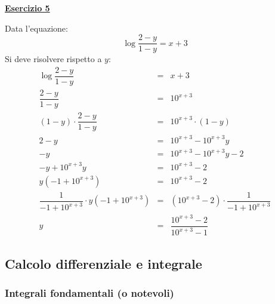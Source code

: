 \documentclass[a4paper]{article}
\newcommand{\example}[1]{\textcolor{Green4}{\textbf{#1}}}
\begin{document}
	\begin{flushleft}
		\example{\underline{Esercizio 5}}
	\end{flushleft}

	\noindent
	Data l'equazione:
	\begin{equation*}
		\log{\dfrac{2-y}{1-y}} = x+3
	\end{equation*}
	Si deve risolvere rispetto a $y$:
	\begin{equation*}
		\begin{array}{rcl}
			\log{\dfrac{2-y}{1-y}} &=& x+3 \\ [1em]
			\dfrac{2-y}{1-y} &=& 10^{x+3} \\ [1em]
			\left(1-y\right) \cdot \dfrac{2-y}{1-y} &=& 10^{x+3} \cdot \left(1-y\right) \\ [1em]
			2-y &=& 10^{x+3} - 10^{x+3}y \\ [1em]
			-y &=& 10^{x+3} - 10^{x+3}y -2 \\ [1em]
			-y + 10^{x+3}y &=& 10^{x+3} - 2 \\ [1em]
			y\left(-1 + 10^{x+3}\right) &=& 10^{x+3} - 2 \\ [1em]
			\dfrac{1}{-1 + 10^{x+3}} \cdot y\left(-1 + 10^{x+3}\right) &=& \left(10^{x+3} - 2\right) \cdot \dfrac{1}{-1 + 10^{x+3}} \\ [1em]
			y &=& \dfrac{10^{x+3} - 2}{10^{x+3} - 1}
		\end{array}
	\end{equation*}\newpage

	\subsection{Calcolo differenziale e integrale}\label{subsection: calcolo differenziale e integrale}

	\subsubsection{Integrali fondamentali (o notevoli)}\label{subsubsection: integrali fondamentali (o notevoli)}
\end{document}
